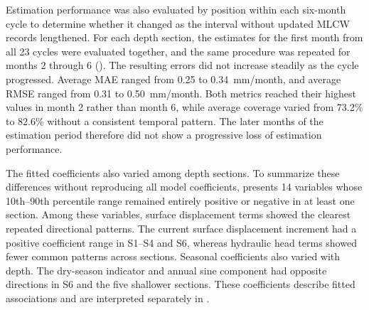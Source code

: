 Estimation performance was also evaluated by position within each six-month cycle to determine whether it changed as the interval without updated MLCW records lengthened. For each depth section, the estimates for the first month from all 23 cycles were evaluated together, and the same procedure was repeated for months 2 through 6 (). The resulting errors did not increase steadily as the cycle progressed. Average MAE ranged from 0.25 to 0.34~mm/month, and average RMSE ranged from 0.31 to 0.50~mm/month. Both metrics reached their highest values in month 2 rather than month 6, while average coverage varied from 73.2\% to 82.6\% without a consistent temporal pattern. The later months of the estimation period therefore did not show a progressive loss of estimation performance.

The fitted coefficients also varied among depth sections. To summarize these differences without reproducing all model coefficients,  presents 14 variables whose 10th--90th percentile range remained entirely positive or negative in at least one section. Among these variables, surface displacement terms showed the clearest repeated directional patterns. The current surface displacement increment had a positive coefficient range in S1--S4 and S6, whereas hydraulic head terms showed fewer common patterns across sections. Seasonal coefficients also varied with depth. The dry-season indicator and annual sine component had opposite directions in S6 and the five shallower sections. These coefficients describe fitted associations and are interpreted separately in . %

